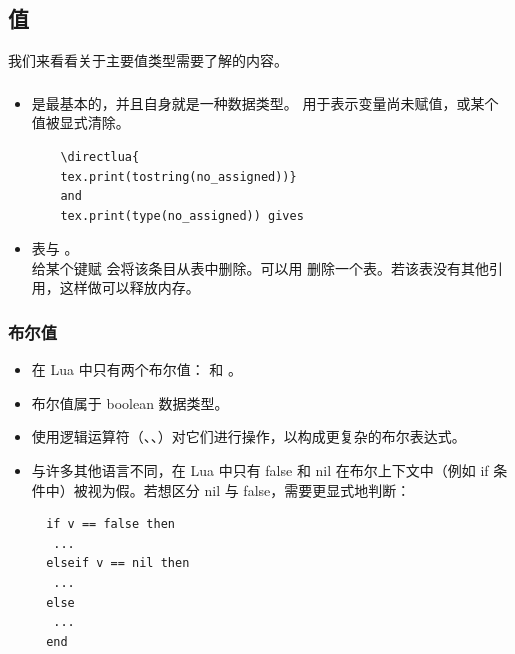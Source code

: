 \subsection{值}

我们来看看关于主要值类型需要了解的内容。


\subsubsection{}


  \begin{itemize}

    \item  {} 是最基本的，并且自身就是一种数据类型。 用于表示变量尚未赋值，或某个值被显式清除。

\begin{mybox}
  \begin{verbatim}
    \directlua{
    tex.print(tostring(no_assigned))}
    and
    tex.print(type(no_assigned)) gives
  \end{verbatim}
\end{mybox}

\item 表与 。\\

给某个键赋  会将该条目从表中删除。可以用  删除一个表。若该表没有其他引用，这样做可以释放内存。

  \end{itemize}

\subsubsection{布尔值}

\begin{itemize}
  \item 在 Lua 中只有两个布尔值： 和 。
  \item 布尔值属于 boolean 数据类型。
  \item 使用逻辑运算符（、、）对它们进行操作，以构成更复杂的布尔表达式。
  \item 与许多其他语言不同，在 Lua 中只有 false 和 nil 在布尔上下文中（例如 if 条件中）被视为假。若想区分 nil 与 false，需要更显式地判断：
\begin{mybox}
\begin{verbatim}
  if v == false then
   ...
  elseif v == nil then
   ...
  else
   ...
  end
\end{verbatim}
\end{mybox}
\end{itemize}

